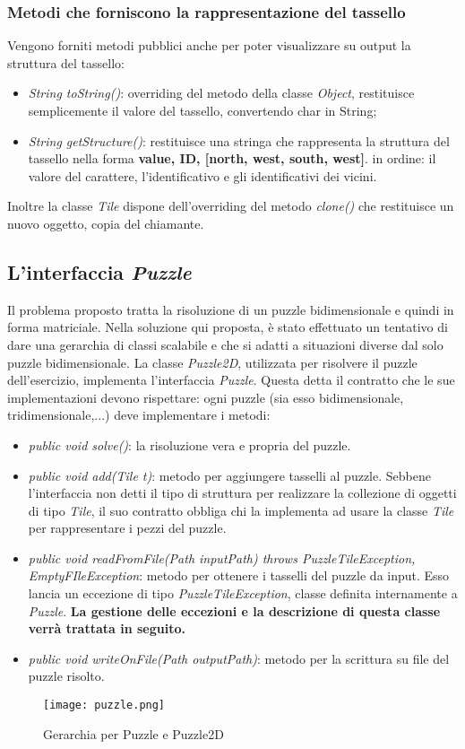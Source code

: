 \documentclass{article}
\begin{document}
\subsubsection{Metodi che forniscono la rappresentazione del tassello}
Vengono forniti metodi pubblici anche per poter visualizzare su output la struttura del tassello:
\begin{itemize}
\item \textit{String toString()}: overriding del metodo della classe \textit{Object}, restituisce semplicemente il valore del tassello, convertendo char in String;
\item \textit{String getStructure()}: restituisce una stringa che rappresenta la struttura del tassello nella forma \textbf{value, ID, [north, west, south, west]}. in ordine: il valore del carattere, l'identificativo e gli identificativi dei vicini.
\end{itemize} 
Inoltre la classe \textit{Tile} dispone dell'overriding del metodo \textit{clone()} che restituisce un nuovo oggetto, copia del chiamante.

\subsection{L'interfaccia \textit{Puzzle}}
Il problema proposto tratta la risoluzione di un puzzle bidimensionale e quindi in forma matriciale. Nella soluzione qui proposta, è stato effettuato un tentativo di dare una gerarchia di classi scalabile e che si adatti a situazioni diverse dal solo puzzle bidimensionale. La classe \textit{Puzzle2D}, utilizzata per risolvere il puzzle dell'esercizio, implementa l'interfaccia \textit{Puzzle}. Questa detta il contratto che le sue implementazioni devono rispettare: ogni puzzle (sia esso bidimensionale, tridimensionale,...) deve implementare i metodi:
\begin{itemize}
\item \textit{public void solve()}: la risoluzione vera e propria del puzzle.
\item \textit{public void add(Tile t)}: metodo per aggiungere tasselli al puzzle. Sebbene l'interfaccia non detti il tipo di struttura per realizzare la collezione di oggetti di tipo \textit{Tile}, il suo contratto obbliga chi la implementa ad usare la classe \textit{Tile} per rappresentare i pezzi del puzzle.
\item \textit{public void readFromFile(Path inputPath) throws PuzzleTileException, EmptyFIleException}: metodo per ottenere i tasselli del puzzle da input. Esso lancia un eccezione di tipo \textit{PuzzleTileException}, classe definita internamente a \textit{Puzzle}. \textbf{La gestione delle eccezioni e la descrizione di questa classe verrà trattata in seguito.}
\item \textit{public void writeOnFile(Path outputPath)}: metodo per la scrittura su file del puzzle risolto.
\end{itemize}
\begin{figure}[ht!]
\centering
\texttt{[image: puzzle.png]}
\caption{Gerarchia per Puzzle e Puzzle2D \label{overflow}}
\end{figure}
\end{document}
